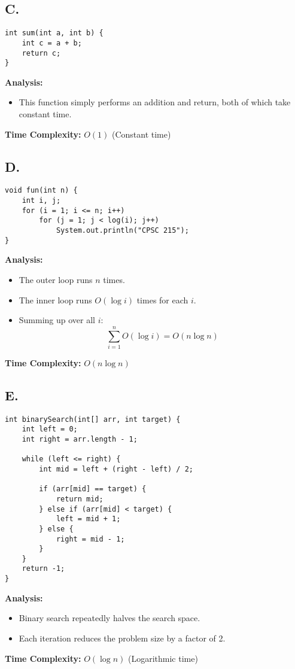 \documentclass{article}
\begin{document}
\subsection*{C.}
\begin{lstlisting}
int sum(int a, int b) {
    int c = a + b;
    return c;
}
\end{lstlisting}

\textbf{Analysis:}
\begin{itemize}
  \item This function simply performs an addition and return, both of which take constant time.
\end{itemize}
\textbf{Time Complexity:} \( O(1) \) (Constant time)

\subsection*{D.}
\begin{lstlisting}
void fun(int n) {
    int i, j;
    for (i = 1; i <= n; i++)
        for (j = 1; j < log(i); j++)
            System.out.println("CPSC 215");
}
\end{lstlisting}

\textbf{Analysis:}
\begin{itemize}
  \item The outer loop runs \( n \) times.
  \item The inner loop runs \( O(\log i) \) times for each \( i \).
  \item Summing up over all \( i \):
    \[
      \sum_{i=1}^{n} O(\log i) = O(n \log n)
    \]
\end{itemize}
\textbf{Time Complexity:} \( O(n \log n) \)

\subsection*{E.}
\begin{lstlisting}
int binarySearch(int[] arr, int target) {
    int left = 0;
    int right = arr.length - 1;

    while (left <= right) {
        int mid = left + (right - left) / 2;

        if (arr[mid] == target) {
            return mid;
        } else if (arr[mid] < target) {
            left = mid + 1;
        } else {
            right = mid - 1;
        }
    }
    return -1;
}
\end{lstlisting}

\textbf{Analysis:}
\begin{itemize}
  \item Binary search repeatedly halves the search space.
  \item Each iteration reduces the problem size by a factor of 2.
\end{itemize}
\textbf{Time Complexity:} \( O(\log n) \) (Logarithmic time)
\end{document}
